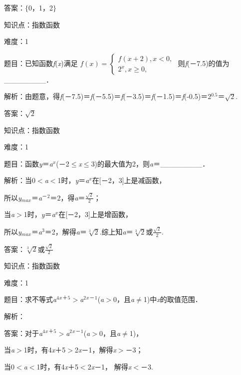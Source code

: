 \documentclass{article} %
\begin{document}
答案：$\mathrm{\{}$0，1，2$\mathrm{\}}$

知识点：指数函数

难度：1

题目：已知函数\textit{f}(\textit{x})满足
$f(x)=\left\{
\begin{aligned}
f(x+2),x<0,\\
2^{x},x\geq0,
\end{aligned}
\right.
$
则\textit{f}(－7.5)的值为\_\_\_\_\_\_\_\_．

解析：由题意，得\textit{f}(－7.5)＝\textit{f}(－5.5)＝\textit{f}(－3.5)＝\textit{f}(－1.5)＝\textit{f}(-0.5)＝2${}^{0.5}$＝$\sqrt{2}$.

答案：$\sqrt{2}$

知识点：指数函数

难度：1

题目：函数\textit{y}＝\textit{a${}^{x}$}(－2$\mathrm{\le}$\textit{x}$\mathrm{\le}$3)的最大值为2，则\textit{a}＝\_\_\_\_\_\_\_\_．

解析：当0$\mathrm{<}$\textit{a}$\mathrm{<}$1时，\textit{y}＝\textit{a${}^{x}$}在[－2，3]上是减函数，

所以\textit{y}${}_{max}$＝\textit{a}${}^{\textrm{－}}$${}^{2}$＝2，得\textit{a}＝$\frac{\sqrt{2}}{2}$；

当\textit{a}$\mathrm{>}$1时，\textit{y}＝\textit{a${}^{x}$}在[－2，3]上是增函数，

所以\textit{y}${}_{max}$＝\textit{a}${}^{3}$＝2，解得\textit{a}＝$\sqrt[3]{2}$.综上知\textit{a}＝$\sqrt[3]{2}$或$\frac{\sqrt{2}}{2}$.

答案：$\sqrt[3]{2}$或$\frac{\sqrt{2}}{2}$

知识点：指数函数

难度：1

题目：求不等式\textit{a}${}^{4}$\textit{${}^{x}$}${}^{\textrm{＋}}$${}^{5}$$\mathrm{>}$\textit{a}${}^{2}$\textit{${}^{x}$}${}^{\textrm{－}}$${}^{1}$(\textit{a}$\mathrm{>}$0，且\textit{a}$\mathrm{\neq}$1)中\textit{x}的取值范围．

解析：

答案：对于\textit{a}${}^{4}$\textit{${}^{x}$}${}^{\textrm{＋}}$${}^{5}$$\mathrm{>}$\textit{a}${}^{2}$\textit{${}^{x}$}${}^{\textrm{－}}$${}^{1}$(\textit{a}$\mathrm{>}$0，且\textit{a}$\mathrm{\neq}$1)，

当\textit{a}$\mathrm{>}$1时，有4\textit{x}＋5$\mathrm{>}$2\textit{x}－1，解得\textit{x}$\mathrm{>}$－3；

当0$\mathrm{<}$\textit{a}$\mathrm{<}$1时，有4\textit{x}＋5$\mathrm{<}$2\textit{x}－1， 解得\textit{x}$\mathrm{<}$－3.
\end{document}
